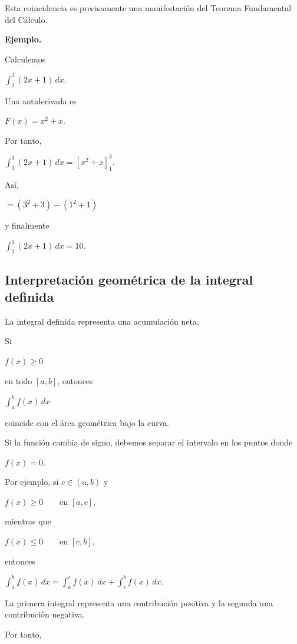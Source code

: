 \documentclass[12pt]{article}
\newenvironment{Ejem}
{\par\medskip\noindent\textbf{Ejemplo.}\ }
{\par\medskip}
\begin{document}
Esta coincidencia es precisamente una manifestación del Teorema
Fundamental del Cálculo.


\begin{Ejem}

Calculemos

$
\int_1^3(2x+1)\,dx.
$

Una antiderivada es

$
F(x)=x^2+x.
$

Por tanto,

$
\int_1^3(2x+1)\,dx
=
\left[x^2+x\right]_1^3.
$

Así,

$
=
(3^2+3)-(1^2+1)
$

y finalmente

$
\boxed{
\int_1^3(2x+1)\,dx=10.
}
$

\end{Ejem}

\subsection*{Interpretación geométrica de la integral definida}

La integral definida representa una acumulación neta.

Si

$
f(x)\geq0
$

en todo $[a,b]$, entonces

$
\int_a^b f(x)\,dx
$

coincide con el área geométrica bajo la curva.

Si la función cambia de signo, debemos separar el intervalo en los puntos
donde

$
f(x)=0.
$

Por ejemplo, si $c\in(a,b)$ y

$
f(x)\geq0
\qquad\text{en }[a,c],
$

mientras que

$
f(x)\leq0
\qquad\text{en }[c,b],
$

entonces

$
\int_a^b f(x)\,dx
=
\int_a^c f(x)\,dx
+
\int_c^b f(x)\,dx.
$

La primera integral representa una contribución positiva y la segunda una
contribución negativa.

Por tanto,
\end{document}

